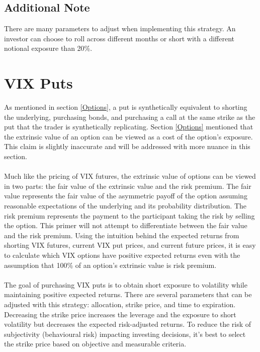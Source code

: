 \documentclass[11pt, oneside]{book}
\begin{document}
\subsection{Additional Note} \label{Investing-ShortFrontFut-Note}
There are many parameters to adjust when implementing this strategy. An investor can choose to roll across different months or short with a different notional exposure than 20\%. 

\section{VIX Puts} \label{Investing-VIXPut}
As mentioned in section \ref{Options}, a put is synthetically equivalent to shorting the underlying, purchasing bonds, and purchasing a call at the same strike as the put that the trader is synthetically replicating. Section \ref{Options} mentioned that the extrinsic value of an option can be viewed as a cost of the option's exposure. This claim is slightly inaccurate and will be addressed with more nuance in this section.\\
\\
Much like the pricing of VIX futures, the extrinsic value of options can be viewed in two parts: the fair value of the extrinsic value and the risk premium. The fair value represents the fair value of the asymmetric payoff of the option assuming reasonable expectations of the underlying and its probability distribution. The risk premium represents the payment to the participant taking the risk by selling the option. This primer will not attempt to differentiate between the fair value and the risk premium. Using the intuition behind the expected returns from shorting VIX futures, current VIX put prices, and current future prices, it is easy to calculate which VIX options have positive expected returns even with the assumption that 100\% of an option's extrinsic value is risk premium.\\
\\
The goal of purchasing VIX puts is to obtain short exposure to volatility while maintaining positive expected returns. There are several parameters that can be adjusted with this strategy: allocation, strike price, and time to expiration. Decreasing the strike price increases the leverage and the exposure to short volatility but decreases the expected risk-adjusted returns. To reduce the risk of subjectivity (behavioural risk) impacting investing decisions, it's best to select the strike price based on objective and measurable criteria.
\end{document}
